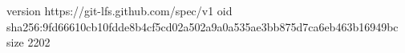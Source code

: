 version https://git-lfs.github.com/spec/v1
oid sha256:9fd66610cb10fdde8b4cf5cd02a502a9a0a535ae3bb875d7ca6eb463b16949bc
size 2202
